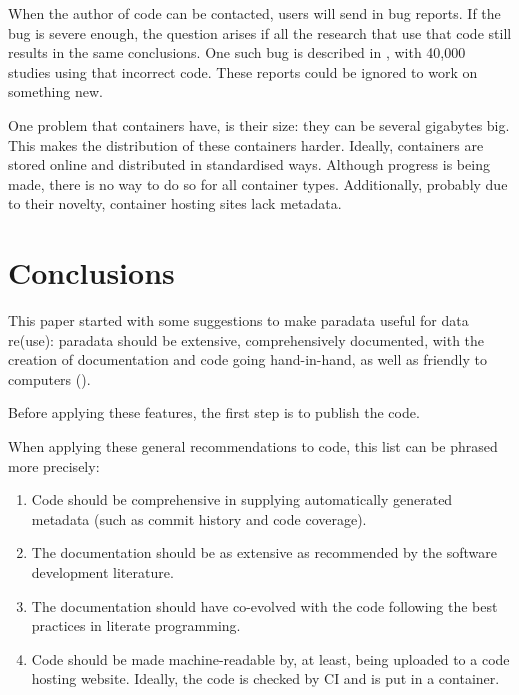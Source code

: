 
When the author of code can be contacted,
users will send in bug reports.
If the bug is severe enough, the question arises
if all the research that use that code still 
results in the same conclusions.
One such bug is described in \cite{eklund2016cluster},
with 40,000 studies using that incorrect code.
These reports could be ignored to work on something new.


One problem that containers have, is their size:
they can be several gigabytes big. 
This makes the distribution of these containers harder.
Ideally, containers are stored online and distributed in
standardised ways.
Although progress is being made, 
there is no way to do so for all container types.
Additionally, probably due to their novelty,
container hosting sites lack metadata.

\section{Conclusions}

This paper started with some suggestions to 
make paradata useful for data re(use):
paradata should be extensive, comprehensively documented,
with the creation of documentation and code going hand-in-hand,
as well as friendly to computers (\cite{huvila2022improving}).

Before applying these features, the first step is to publish 
the code. 

When applying these general recommendations to code, 
this list can be phrased more precisely:

\begin{enumerate}
  \item Code should be comprehensive 
    in supplying automatically generated metadata (such as commit history and code coverage).
  \item The documentation should be as extensive as recommended by the 
    software development literature.
  \item The documentation should have co-evolved with the
    code following the best practices in literate programming. 
  \item Code should be made machine-readable by, at least,
    being uploaded to a code hosting website.
    Ideally, the code is checked by CI and is put in a container.
\end{enumerate}

